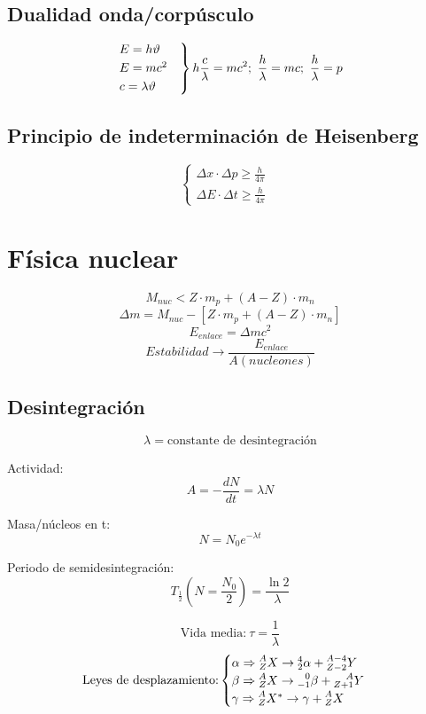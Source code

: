 \documentclass{article}
\begin{document}
\begin{multicols}{2}[]
\subsection{Dualidad onda/corpúsculo}

\[
  \begin{rcases}
    E=h\vartheta &\\
    E=mc^2 &\\
    c=\lambda\vartheta
  \end{rcases} h\frac{c}{\lambda}=mc^2;\ \frac{h}{\lambda}=mc; \ \frac{h}{\lambda}=p
\]

\subsection{Principio de indeterminación de Heisenberg}
\[
  \begin{cases}
    \Delta x\cdot\Delta p\geq\frac{h}{4\pi} &\\
    \Delta E\cdot\Delta t\geq\frac{h}{4\pi}  
  \end{cases}
\]

\section{Física nuclear}
\[M_{nuc}<Z\cdot m_p + (A-Z)\cdot m_n\]
\[\Delta m=M_{nuc} - [Z\cdot m_p + (A-Z)\cdot m_n]\]
\[E_{enlace}=\Delta mc^2\]
\[Estabilidad\rightarrow \frac{E_{enlace}}{A(nucleones)}\]

\subsection{Desintegración}
\[\lambda = \text{constante de desintegración}\]

Actividad: 
\[A=-\frac{dN}{dt}=\lambda N\]

Masa/núcleos en t: 
\[N=N_0 e^{-\lambda t}\]

Periodo de semidesintegración:
\[T_{\frac{1}{2}}\left(N=\frac{N_0}{2}\right)=\frac{\ln 2}{\lambda}\]

\[\text{Vida media:}\ \tau = \frac{1}{\lambda}\]
\[
\text{Leyes de desplazamiento:}
\begin{cases}
  \alpha\Rightarrow\prescript{A}{Z}{X}\rightarrow\prescript{4}{2}{\alpha}+\prescript{A-4}{Z-2}{Y}&\\
  \beta\Rightarrow\prescript{A}{Z}{X}\rightarrow\prescript{0}{-1}{\beta}+\prescript{A}{Z+1}{Y} &\\
  \gamma\Rightarrow\prescript{A}{Z}{X}^*\rightarrow\gamma+\prescript{A}{Z}{X}
\end{cases}
\]
\end{multicols}
\end{document}

